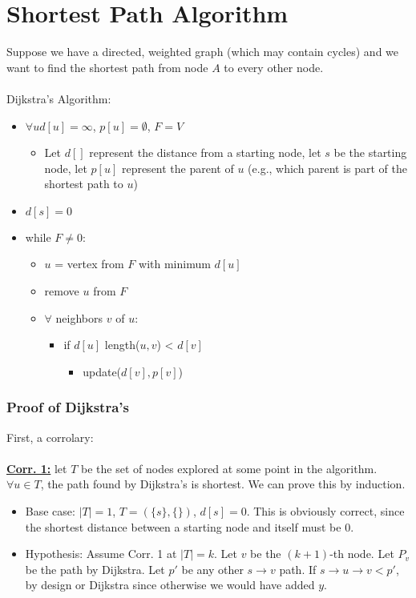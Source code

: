\documentclass[10pt]{article}
\begin{document}
\section*{Shortest Path Algorithm}
Suppose we have a directed, weighted graph (which may contain cycles) and we want to find the shortest path from node $A$ to every other node.\\\\
Dijkstra's Algorithm:
\begin{itemize}
    \item $\forall u d[u] = \infty$, $p[u] = \emptyset$, $F = V$
    \begin{itemize}
	    \item Let $d[]$ represent the distance from a starting node, let $s$ be the starting node, let $p[u]$ represent the parent of $u$ (e.g., which parent is part of the shortest path to $u$)
    \end{itemize}
    \item $d[s] = 0$
    \item while $F \neq 0$:
    \begin{itemize}
	    \item $u$ = vertex from $F$ with minimum $d[u]$
	    \item remove $u$ from $F$
	    \item $\forall$ neighbors $v$ of $u$:
	    \begin{itemize}
	        \item if $d[u]$ length($u, v$) < $d[v]$
	        \begin{itemize}
	            \item update($d[v], p[v]$)
            \end{itemize} 
        \end{itemize}
    \end{itemize}
\end{itemize}

\subsubsection*{Proof of Dijkstra's}
First, a corrolary:\\\\
\textbf{\underline{Corr. 1:}} let $T$ be the set of nodes explored at some point in the algorithm.  $\forall u \in T$, the path found by Dijkstra's is shortest.
We can prove this by induction.
\begin{itemize}
	\item Base case: $|T| = 1$, $T = (\{s\}, \{\})$, $d[s] = 0$.  This is obviously correct, since the shortest distance between a starting node and itself must be $0$.
	\item Hypothesis: Assume Corr. 1 at $|T| = k$.  Let $v$ be the $(k+1)$-th node.  Let $P_v$ be the path by Dijkstra.  Let $p'$ be any other $s \rightarrow v$ path.  If $s \rightarrow u \rightarrow v < p'$, by design or Dijkstra since otherwise we would have added $y$.
\end{itemize}
\end{document}
